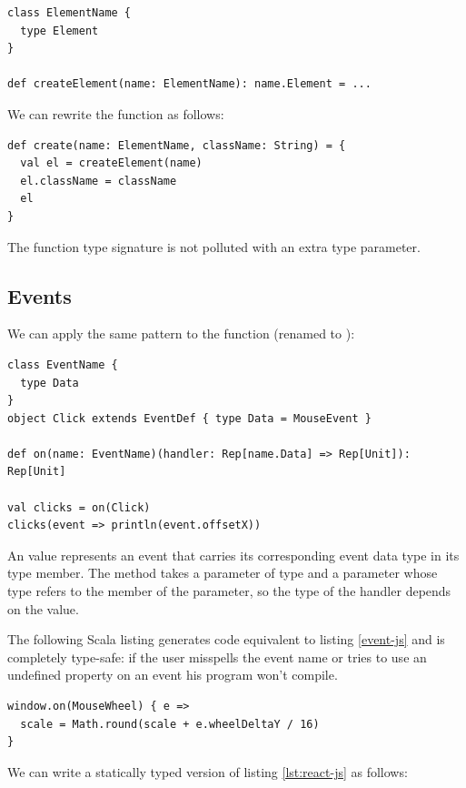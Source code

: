 \documentclass[runningheads,a4paper]{llncs}
\begin{document}
\begin{lstlisting}
class ElementName {
  type Element
}

def createElement(name: ElementName): name.Element = ...
\end{lstlisting}

We can rewrite the  function as follows:

\begin{lstlisting}
def create(name: ElementName, className: String) = {
  val el = createElement(name)
  el.className = className
  el
}
\end{lstlisting}

The  function type signature is not polluted with an extra type parameter.


\subsection{Events}

We can apply the same pattern to the  function (renamed to ):

\begin{lstlisting}
class EventName {
  type Data
}
object Click extends EventDef { type Data = MouseEvent }

def on(name: EventName)(handler: Rep[name.Data] => Rep[Unit]): Rep[Unit]

val clicks = on(Click)
clicks(event => println(event.offsetX))
\end{lstlisting}

An  value represents an event that carries its corresponding event data type in its
 type member. The  method takes a parameter  of type 
and a  parameter whose type refers to the  member of the 
parameter, so the type of the handler depends on the  value.

The following Scala listing generates code equivalent to listing \ref{event-js} and is completely
type-safe: if the user misspells the event name or tries to use an undefined property on an event
his program won’t compile.

\begin{lstlisting}
window.on(MouseWheel) { e =>
  scale = Math.round(scale + e.wheelDeltaY / 16)
}
\end{lstlisting}

We can write a statically typed version of listing \ref{lst:react-js} as follows:
\end{document}
